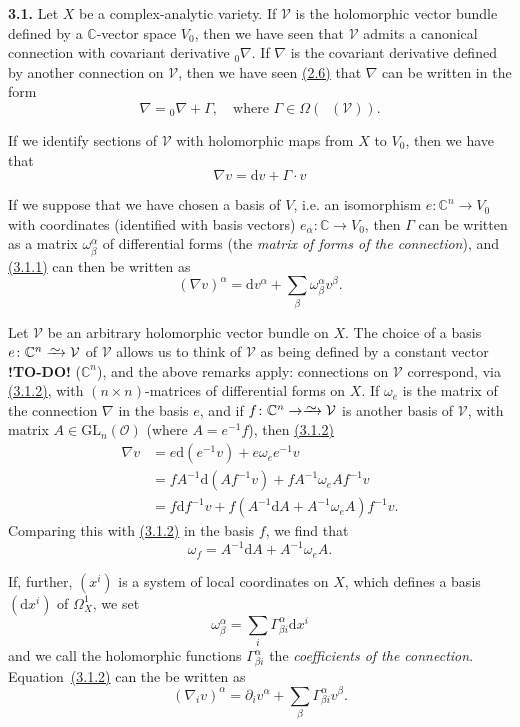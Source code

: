 \documentclass{report}
\newenvironment{rmenv}[1]
  {\phantomsection\par\medskip\noindent\textbf{#1.}\rmfamily}
  {\par\medskip}
\renewcommand{\cal}[1]{{\mathcal{#1}}}
\newcommand{\CC}{\mathbb{C}}
\newcommand{\dd}{\mathrm{d}}
\newcommand{\GL}{\mathrm{GL}}
\newcommand{\simto}{\xrightarrow{\raisebox{-0.7ex}[0ex][0ex]{$\sim$}}}
\DeclareMathOperator{\shEnd}{\underline{End}}
\newcommand{\todo}{\textbf{ !TO-DO! }}
\newcommand{\oldpage}[1]{\marginpar{\footnotesize$\Big\vert$ \textit{p.~#1}}}
\begin{document}
\begin{rmenv}{3.1}
\label{I.3.1}
  Let $X$ be a complex-analytic variety.
  If $\cal{V}$ is the holomorphic vector bundle defined by a $\CC$-vector space $V_0$, then we have seen that $\cal{V}$ admits a canonical connection with covariant derivative ${}_0\!\nabla$.
  If $\nabla$ is the covariant derivative defined by another connection on $\cal{V}$, then we have seen \hyperref[I.2.6]{(2.6)} that $\nabla$ can be written in the form
  \[
    \nabla = {}_0\!\nabla + \Gamma,
    \quad\mbox{where $\Gamma\in\Omega(\shEnd(\cal{V}))$.}
  \]

  If we identify sections of $\cal{V}$ with holomorphic maps from $X$ to $V_0$, then we have that
  \[
  \label{I.3.1.1}
    \nabla v = \dd v + \Gamma\cdot v
  \tag{3.1.1}
  \]

  If we suppose that we have chosen a basis of $V$, i.e. an isomorphism $e\colon\CC^n\to V_0$ with coordinates (identified with basis vectors) $e_\alpha\colon\CC\to V_0$, then $\Gamma$ can be written as a matrix $\omega_\beta^\alpha$ of differential forms (the \emph{matrix of forms of the connection}), and \hyperref[I.3.1.1]{(3.1.1)} can then be written as
  \[
  \label{I.3.1.2}
    (\nabla v)^\alpha = \dd v^\alpha + \sum_\beta \omega_\beta^\alpha v^\beta.
  \tag{3.1.2}
  \]

  Let $\cal{V}$ be an arbitrary holomorphic vector bundle on $X$.
  The choice of a basis $e\colon\CC^n\simto\cal{V}$ of $\cal{V}$ allows us to think of $\cal{V}$ as being defined by a
\oldpage{22}
  constant vector \todo ($\CC^n$), and the above remarks apply:
  connections on $\cal{V}$ correspond, via \hyperref[I.3.1.2]{(3.1.2)}, with $(n\times n)$-matrices of differential forms on $X$.
  If $\omega_e$ is the matrix of the connection $\nabla$ in the basis $e$, and if $f\colon\CC^n\to\simto\cal{V}$ is another basis of $\cal{V}$, with matrix $A\in\GL_n(\cal{O})$ (where $A=e^{-1}f$), then \hyperref[I.3.1.2]{(3.1.2)}
  \[
    \begin{aligned}
      \nabla v
      &= e\dd(e^{-1}v) + e\omega_e e^{-1}v
    \\&= fA^{-1}\dd(Af^{-1}v) + fA^{-1}\omega_e Af^{-1}v
    \\&= f\dd f^{-1}v + f(A^{-1}\dd A + A^{-1}\omega_e A)f^{-1}v.
    \end{aligned}
  \]
  Comparing this with \hyperref[I.3.1.2]{(3.1.2)} in the basis $f$, we find that
  \[
  \label{I.3.1.3}
    \omega_f = A^{-1}\dd A + A^{-1}\omega_e A.
  \tag{3.1.3}
  \]

  If, further, $(x^i)$ is a system of local coordinates on $X$, which defines a basis $(\dd x^i)$ of $\Omega_X^1$, we set
  \[
    \omega_\beta^\alpha = \sum_i \Gamma_{\beta i}^\alpha \dd x^i
  \]
  and we call the holomorphic functions $\Gamma_{\beta i}^\alpha$ the \emph{coefficients of the connection}.
  Equation~\hyperref[I.3.1.2]{(3.1.2)} can the be written as
  \[
  \label{I.3.1.4}
    (\nabla_i v)^\alpha = \partial_i v^\alpha + \sum_\beta \Gamma_{\beta i}^\alpha v^\beta.
  \tag{3.1.4}
  \]


\end{rmenv}
\end{document}
